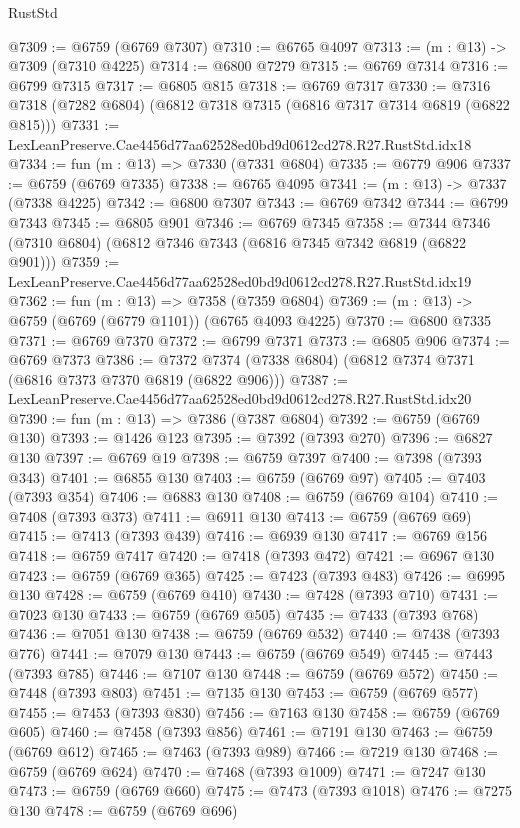 \begin{lexlean}{RustStd}
\begin{coremodule}
@7309 := @6759 (@6769 @7307)
@7310 := @6765 @4097
@7313 := (m : @13) -> @7309 (@7310 @4225)
@7314 := @6800 @7279
@7315 := @6769 @7314
@7316 := @6799 @7315
@7317 := @6805 @815
@7318 := @6769 @7317
@7330 := @7316 @7318 (@7282 @6804) (@6812 @7318 @7315 (@6816 @7317 @7314 @6819 (@6822 @815)))
@7331 := LexLeanPreserve.Cae4456d77aa62528ed0bd9d0612cd278.R27.RustStd.idx18
@7334 := fun (m : @13) => @7330 (@7331 @6804)
@7335 := @6779 @906
@7337 := @6759 (@6769 @7335)
@7338 := @6765 @4095
@7341 := (m : @13) -> @7337 (@7338 @4225)
@7342 := @6800 @7307
@7343 := @6769 @7342
@7344 := @6799 @7343
@7345 := @6805 @901
@7346 := @6769 @7345
@7358 := @7344 @7346 (@7310 @6804) (@6812 @7346 @7343 (@6816 @7345 @7342 @6819 (@6822 @901)))
@7359 := LexLeanPreserve.Cae4456d77aa62528ed0bd9d0612cd278.R27.RustStd.idx19
@7362 := fun (m : @13) => @7358 (@7359 @6804)
@7369 := (m : @13) -> @6759 (@6769 (@6779 @1101)) (@6765 @4093 @4225)
@7370 := @6800 @7335
@7371 := @6769 @7370
@7372 := @6799 @7371
@7373 := @6805 @906
@7374 := @6769 @7373
@7386 := @7372 @7374 (@7338 @6804) (@6812 @7374 @7371 (@6816 @7373 @7370 @6819 (@6822 @906)))
@7387 := LexLeanPreserve.Cae4456d77aa62528ed0bd9d0612cd278.R27.RustStd.idx20
@7390 := fun (m : @13) => @7386 (@7387 @6804)
@7392 := @6759 (@6769 @130)
@7393 := @1426 @123
@7395 := @7392 (@7393 @270)
@7396 := @6827 @130
@7397 := @6769 @19
@7398 := @6759 @7397
@7400 := @7398 (@7393 @343)
@7401 := @6855 @130
@7403 := @6759 (@6769 @97)
@7405 := @7403 (@7393 @354)
@7406 := @6883 @130
@7408 := @6759 (@6769 @104)
@7410 := @7408 (@7393 @373)
@7411 := @6911 @130
@7413 := @6759 (@6769 @69)
@7415 := @7413 (@7393 @439)
@7416 := @6939 @130
@7417 := @6769 @156
@7418 := @6759 @7417
@7420 := @7418 (@7393 @472)
@7421 := @6967 @130
@7423 := @6759 (@6769 @365)
@7425 := @7423 (@7393 @483)
@7426 := @6995 @130
@7428 := @6759 (@6769 @410)
@7430 := @7428 (@7393 @710)
@7431 := @7023 @130
@7433 := @6759 (@6769 @505)
@7435 := @7433 (@7393 @768)
@7436 := @7051 @130
@7438 := @6759 (@6769 @532)
@7440 := @7438 (@7393 @776)
@7441 := @7079 @130
@7443 := @6759 (@6769 @549)
@7445 := @7443 (@7393 @785)
@7446 := @7107 @130
@7448 := @6759 (@6769 @572)
@7450 := @7448 (@7393 @803)
@7451 := @7135 @130
@7453 := @6759 (@6769 @577)
@7455 := @7453 (@7393 @830)
@7456 := @7163 @130
@7458 := @6759 (@6769 @605)
@7460 := @7458 (@7393 @856)
@7461 := @7191 @130
@7463 := @6759 (@6769 @612)
@7465 := @7463 (@7393 @989)
@7466 := @7219 @130
@7468 := @6759 (@6769 @624)
@7470 := @7468 (@7393 @1009)
@7471 := @7247 @130
@7473 := @6759 (@6769 @660)
@7475 := @7473 (@7393 @1018)
@7476 := @7275 @130
@7478 := @6759 (@6769 @696)

\end{coremodule}
\end{lexlean}
